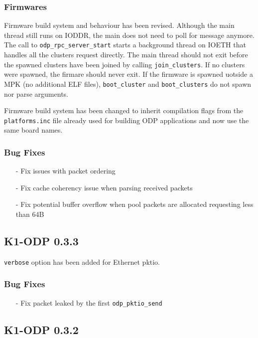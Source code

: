 \documentclass{trkalray}
\begin{document}
\subsubsection{Firmwares}

Firmware build system and behaviour has been revised.
Although the main thread still runs on IODDR, the main does not need
to poll for message anymore.
The call to \texttt{odp\_rpc\_server\_start} starts a background
thread on IOETH that handles all the clusters request directly.
The main thread should not exit before the spawned clusters have been
joined by calling \texttt{join\_clusters}.
If no clusters were spawned, the firmare should never exit.
If the firmware is spawned uotside a MPK (no additional ELF files),
\texttt{boot\_cluster} and \texttt{boot\_clusters} do not spawn nor
parse arguments.

Firmware build system has been changed to inherit compilation flags
from the \texttt{platforms.inc} file already used for building ODP
applications and now use the same board names.

\subsubsection{Bug Fixes}
\begin{itemize}
\item[-]{Fix issues with packet ordering}
\item[-]{Fix cache coherency issue when parsing received packets}
\item[-]{Fix potential buffer overflow when pool packets are allocated
requesting less than 64B}
\end{itemize}

\subsection{K1-ODP 0.3.3}

\texttt{verbose} option has been added for Ethernet pktio.

\subsubsection{Bug Fixes}
\begin{itemize}
\item[-]{Fix packet leaked by the first \texttt{odp\_pktio\_send}}
\end{itemize}

\subsection{K1-ODP 0.3.2}
\end{document}
